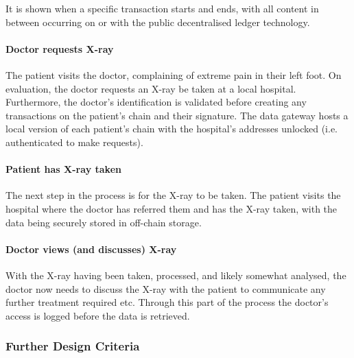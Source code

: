 It is shown when a specific transaction starts and ends, with all content in between occurring on or with the public decentralised ledger technology.

\paragraph{Doctor requests X-ray}

The patient visits the doctor, complaining of extreme pain in their left foot. On evaluation, the doctor requests an X-ray be taken at a local hospital. Furthermore, the doctor's identification is validated before creating any transactions on the patient's chain and their signature. The data gateway hosts a local version of each patient's chain with the hospital's addresses unlocked (i.e. authenticated to make requests).





\paragraph{Patient has X-ray taken}

The next step in the process is for the X-ray to be taken. The patient visits the hospital where the doctor has referred them and has the X-ray taken, with the data being securely stored in off-chain storage.



\paragraph{Doctor views (and discusses) X-ray}

With the X-ray having been taken, processed, and likely somewhat analysed, the doctor now needs to discuss the X-ray with the patient to communicate any further treatment required etc. Through this part of the process the doctor's access is logged before the data is retrieved.




\subsubsection{Further Design Criteria}

% 

